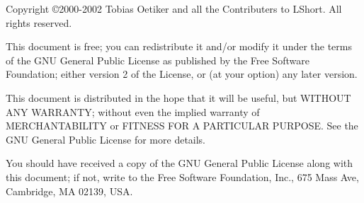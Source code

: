
\ifx\pdfoutput\undefined %
\else
{}
\fi
\newlength{\centeroffset}
\setlength{\centeroffset}{-0.5\oddsidemargin}
\addtolength{\centeroffset}{0.5\evensidemargin}
\thispagestyle{empty}
\noindent\hspace*{\centeroffset}

\noindent\hspace*{\centeroffset}



\pagebreak
\begin{small} 
  Copyright \copyright 2000-2002 Tobias Oetiker and all the Contributers to
  LShort.  All rights reserved.
 
  This document is free; you can redistribute it and/or modify it
  under the terms of the GNU General Public License as published by
  the Free Software Foundation; either version 2 of the License, or
  (at your option) any later version.
  
  This document is distributed in the hope that it will be useful, but
  WITHOUT ANY WARRANTY; without even the implied warranty of
  MERCHANTABILITY or FITNESS FOR A PARTICULAR PURPOSE\@.  See the GNU
  General Public License for more details.
  
  You should have received a copy of the GNU General Public License
  along with this document; if not, write to the Free Software
  Foundation, Inc., 675 Mass Ave, Cambridge, MA 02139, USA.

\end{small}


\endinput

%

